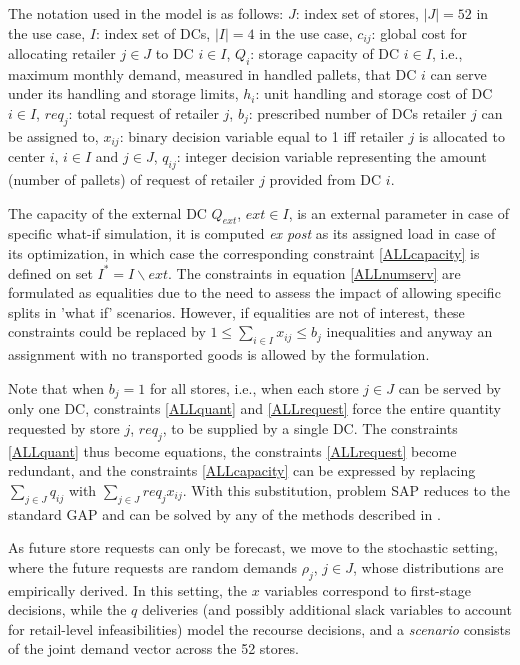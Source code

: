 \documentclass[mnsc,sglanonrev]{informs4}  %
\theoremstyle{remark}\newtheorem{remark}{Remark}
\begin{document}
The notation used in the model is as follows:
	$J$: index set of stores, $|J|=52$ in the use case,
	$I$: index set of DCs, $|I|=4$ in the use case,
	$c_{ij}$: global cost for allocating retailer $j \in J$ to DC $i \in I$,
	$Q_i$: storage capacity of DC $i \in I$, i.e., maximum monthly demand, measured in handled pallets, that DC \(i\) can serve under its handling and storage limits,
	$h_i$: unit handling and storage cost of DC $i \in I$,
	$req_j$: total request of retailer $j$,
	$b_j$: prescribed number of DCs retailer $j$ can be assigned to,
	$x_{ij}$: binary decision variable equal to 1 iff retailer $j$ is allocated to center $i$, $i \in I$ and $j \in J$,
	$q_{ij}$: integer decision variable representing the amount (number of pallets) of request of retailer $j$ provided from DC $i$.

{ 
The capacity of the external DC $Q_{ext}$, $ext \in I$, is an external parameter in case of specific what-if simulation, it is computed \textit{ex post} as its assigned load in case of its optimization, in which case the corresponding constraint \ref{ALLcapacity} is defined on set $I^* = I \backslash ext$. The constraints in equation \ref{ALLnumserv} are formulated as equalities due to the need to assess the impact of allowing specific splits in 'what if' scenarios. However, if equalities are not of interest, these constraints could be replaced by $1 \leq \sum_{i \in I} x_{ij} \leq b_j$ inequalities and anyway an assignment with no transported goods is allowed by the formulation.

Note that when $b_j = 1$ for all stores, i.e., when each store $j \in J$ can be served by only one DC, constraints \ref{ALLquant} and \ref{ALLrequest} force the entire quantity requested by store $j$, $req_j$, to be supplied by a single DC. The constraints \ref{ALLquant} thus become equations, the constraints \ref{ALLrequest} become redundant, and the constraints \ref{ALLcapacity} can be expressed by replacing $\sum_{j \in J}q_{ij}$ with $\sum_{j \in J}req_j x_{ij}$. With this substitution, problem SAP reduces to the standard GAP and can be solved by any of the methods described in \citet{matheuristics}.
}

As future store requests can only be forecast, we move to the stochastic setting, where the future requests are random demands $\rho_j$, $j \in J$, whose distributions are empirically derived. In this setting, the $x$ variables correspond to first-stage decisions, while the $q$ deliveries (and possibly additional slack variables to account for retail-level infeasibilities) model the recourse decisions, and a \textit{scenario} consists of the joint demand vector across the 52 stores.
\end{document}
